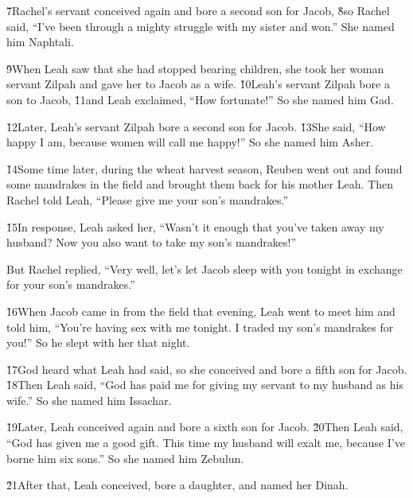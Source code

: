 \v{7}Rachel's servant conceived again and bore a second son for Jacob, \v{8}so Rachel said, ``I've been through a mighty struggle with my sister and won.'' She named him Naphtali.

\v{9}When Leah saw that she had stopped bearing children, she took her woman servant Zilpah and gave her to Jacob as a wife. \v{10}Leah's servant Zilpah bore a son to Jacob, \v{11}and Leah exclaimed, ``How fortunate!'' So she named him Gad.

\v{12}Later, Leah's servant Zilpah bore a second son for Jacob. \v{13}She said, ``How happy I am, because women will call me happy!'' So she named him Asher.

\v{14}Some time later, during the wheat harvest season, Reuben went out and found some mandrakes in the field and brought them back for his mother Leah. Then Rachel told Leah, ``Please give me your son's mandrakes.''

\v{15}In response, Leah asked her, ``Wasn't it enough that you've taken away my husband? Now you also want to take my son's mandrakes!''

But Rachel replied, ``Very well, let's let Jacob sleep with you tonight in exchange for your son's mandrakes.''

\v{16}When Jacob came in from the field that evening, Leah went to meet him and told him, ``You're having sex with me tonight. I traded my son's mandrakes for you!'' So he slept with her that night.

\v{17}God heard what Leah had said, so she conceived and bore a fifth son for Jacob. \v{18}Then Leah said, ``God has paid me for giving my servant to my husband as his wife.'' So she named him Issachar.

\v{19}Later, Leah conceived again and bore a sixth son for Jacob. \v{20}Then Leah said, ``God has given me a good gift. This time my husband will exalt me, because I've borne him six sons.'' So she named him Zebulun.

\v{21}After that, Leah conceived, bore a daughter, and named her Dinah.


